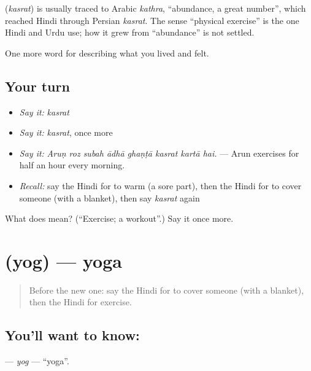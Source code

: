 \begin{cousinweb}
\textbf{} (\emph{kasrat}) is usually traced to Arabic \emph{kathra}, \textquotedblleft{}abundance, a great number\textquotedblright{}, which reached Hindi through Persian \emph{kasrat}. The sense \textquotedblleft{}physical exercise\textquotedblright{} is the one Hindi and Urdu use; how it grew from \textquotedblleft{}abundance\textquotedblright{} is not settled.
\end{cousinweb}

\begin{grammarlens}[title={What you've built}]
One more word for describing what you lived and felt.
\end{grammarlens}

\subsection*{Your turn}
\begin{itemize}
\raggedright
  \item \emph{Say it:} \emph{kasrat}
  \item \emph{Say it:} \emph{kasrat}, once more
  \item \emph{Say it:} \emph{Aruṇ roz subah ādhā ghaṇṭā kasrat kartā hai.} — Arun exercises for half an hour every morning.
  \item \emph{Recall:} say the Hindi for to warm (a sore part), then the Hindi for to cover someone (with a blanket), then say \emph{kasrat} again
\end{itemize}

\begin{tcolorbox}[breakable,colback=teal!4,colframe=teal!35!black,title={Before you move on}]
What does  mean? (\textquotedblleft{}Exercise; a workout\textquotedblright{}.) Say it once more.
\end{tcolorbox}
\section[\texorpdfstring{\hi{योग} (yog)}{योग (yog)}]{ (yog) — yoga}

\label{lesson:HI-C495-yog}



\begin{quote}
Before the new one: say the Hindi for to cover someone (with a blanket), then the Hindi for exercise.
\end{quote}

\subsection*{You'll want to know: }
\textbf{} — \emph{yog} — \textquotedblleft{}yoga\textquotedblright{}.

